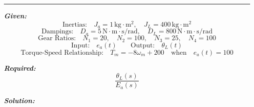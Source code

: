 \documentclass[11pt]{article}
\begin{document}
\begin{figure}[!ht]
\end{figure}

\noindent\rule{\textwidth}{1pt}

\vspace{12pt}


\noindent\textbf{\textit{Given:}}
\[
\text{Inertias:} \quad J_a = 1\,\text{kg} \cdot \text{m}^2, \quad J_L = 400\,\text{kg} \cdot \text{m}^2
\]
\[
\text{Dampings:} \quad D_a = 5\,\text{N} \cdot \text{m} \cdot \text{s/rad}, \quad D_L = 800\,\text{N} \cdot \text{m} \cdot \text{s/rad}
\]
\[
\text{Gear Ratios:} \quad N_1 = 20, \quad N_2 = 100, \quad N_3 = 25, \quad N_4 = 100
\]
\[
\text{Input:} \quad e_a(t)
\quad\quad
\text{Output:} \quad \theta_L(t)
\]
\[
\text{Torque-Speed Relationship:} \quad T_m = -8\omega_m + 200 \quad \text{when} \quad e_a(t) = 100
\]

\vspace{1em}
\noindent

\noindent\textbf{\textit{Required:}}
\[
\frac{\theta_L(s)}{E_a(s)}
\]

\vspace{1.5em}
\noindent\textbf{\textit{Solution:}}
\end{document}
